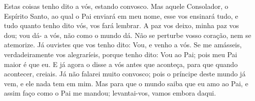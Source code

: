 {  Estas coisas tenho dito a vós, estando
{} convosco.
  Mas aquele Consolador, o Espírito Santo, ao qual o Pai enviará em meu nome, esse vos ensinará tudo, e tudo quanto tenho dito vós,
{} vos fará lembrar.
  A paz vos deixo, minha paz vos dou; vou dá-
{} a vós, não como o mundo
{} dá. Não se perturbe vosso coração, nem se atemorize.
  Já ouvistes que vos tenho dito: Vou, e venho a vós. Se me amásseis, verdadeiramente vos alegraríeis, porque tenho dito: Vou ao Pai; pois meu Pai maior é que eu.
  E já agora o disse a vós antes que aconteça, para que quando acontecer,
{} creiais.
  Já não falarei muito convosco; pois o príncipe deste mundo já vem, e ele nada tem em mim.
  Mas para que o mundo saiba que eu amo ao Pai, e assim faço como o Pai me mandou; levantai-vos, vamos embora daqui.
\par }

